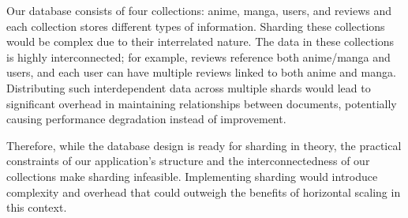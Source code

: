 Our database consists of four collections: anime, manga, users, and reviews and each collection stores different types of information.
Sharding these collections would be complex due to their interrelated nature. The data in these collections is highly interconnected; for example, reviews reference both anime/manga and users, and each user can have multiple reviews linked to both anime and manga. Distributing such interdependent data across multiple shards would lead to significant overhead in maintaining relationships between documents, potentially causing performance degradation instead of improvement.

Therefore, while the database design is ready for sharding in theory, the practical constraints of our application's structure and the interconnectedness of our collections make sharding infeasible. Implementing sharding would introduce complexity and overhead that could outweigh the benefits of horizontal scaling in this context.

